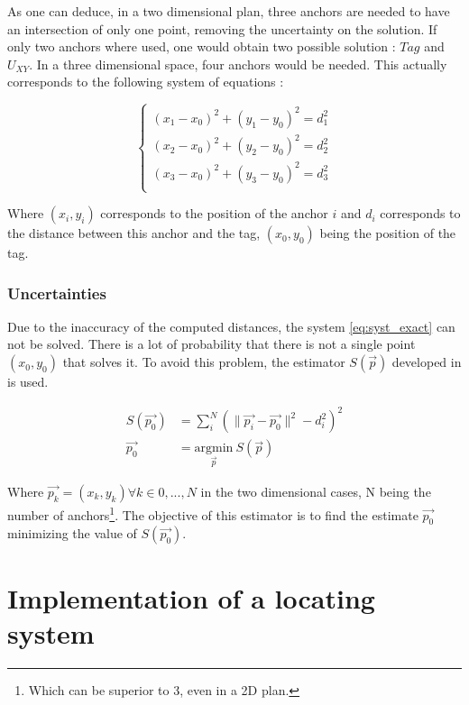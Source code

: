 As one can deduce, in a two dimensional  plan, three anchors are needed to have an intersection of only one point, removing the uncertainty on the solution. If only two anchors where used, one would obtain two possible solution : $Tag$ and $U_{XY}$. In a three dimensional space, four anchors would be needed. This actually corresponds to 
the following system of equations :

\begin{equation}
\label{eq:syst_exact}
\begin{cases}
(x_1 - x_0)^2 + (y_1 - y_0)^2 = d_1^2 \\
(x_2 - x_0)^2 + (y_2 - y_0)^2 = d_2^2 \\
(x_3 - x_0)^2 + (y_3 - y_0)^2 = d_3^2 \\
\end{cases}
\end{equation}

Where $(x_i, y_i)$ corresponds to the position of the anchor $i$ and $d_i$ corresponds to the distance between this anchor and the tag, $(x_0, y_0)$ being the position of the tag.

\subsubsection{Uncertainties}

Due to the inaccuracy of the computed distances, the system \ref{eq:syst_exact} can not be solved. There is a lot of probability that there is not a single point $(x_0, y_0)$ that solves it. To avoid this problem, the estimator $S(\vec{p})$ developed in \cite{zhou2009efficient} is used.

\begin{equation}
\label{eq:syst_approx}
\begin{aligned}
S(\vec{p_0}) &= \sum_i^N (\|\vec{p_i} - \vec{p_0}\| ^2 - d_i^2 )^2 \\
\vec{p_0} &= \underset{\vec{p}}{\text{argmin}}~ S(\vec{p})
\end{aligned}
\end{equation}

Where $\vec{p_k} = (x_k, y_k) \forall k\in {0, ... , N}$ in the two dimensional cases, N being the number of anchors\footnote{Which can be superior to 3, even in a 2D plan.}. The objective of this estimator is to find the estimate $\vec{p_0}$ minimizing the value of $S(\vec{p_0})$.

\section{Implementation of a locating system}
\label{loc_syst}

